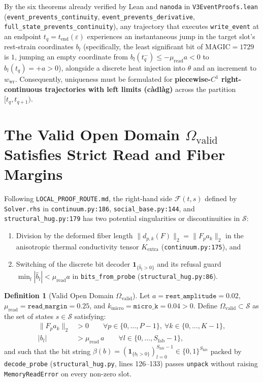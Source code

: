 \documentclass[11pt,a4paper]{article}
\theoremstyle{definition}
\newtheorem{definition}[theorem]{Definition}
\begin{document}
By the six theorems already verified by Lean and \texttt{nanoda} in \texttt{V3EventProofs.lean} (\texttt{event\_prevents\_continuity}, \texttt{event\_prevents\_derivative}, \texttt{full\_state\_prevents\_continuity}), any trajectory that executes \texttt{write\_event} at an endpoint $t_q = t_{\mathrm{end}}(\varepsilon)$ experiences an instantaneous jump in the target slot's rest-strain coordinates $b_l$ (specifically, the least significant bit of $\mathrm{MAGIC}=1729$ is $1$, jumping an empty coordinate from $b_l(t_q^-) \le -\mu_{\mathrm{read}}a < 0$ to $b_l(t_q) = +a > 0$), alongside a discrete heat injection into $\theta$ and an increment to $w_{\mathrm{wr}}$. Consequently, uniqueness must be formulated for \textbf{piecewise-$C^1$ right-continuous trajectories with left limits (c\`adl\`ag)} across the partition $[t_q, t_{q+1})$.

\section{\texorpdfstring{The Valid Open Domain $\Omega_{\mathrm{valid}}$ Satisfies Strict Read and Fiber Margins}{The Valid Open Domain Satisfies Strict Read and Fiber Margins}}

Following \texttt{LOCAL\_PROOF\_ROUTE.md}, the right-hand side $\mathcal{F}(t, s)$ defined by \texttt{Solver.rhs} in \texttt{continuum.py:186}, \texttt{social\_base.py:144}, and \texttt{structural\_hug.py:179} has two potential singularities or discontinuities in $\mathcal{S}$:
\begin{enumerate}
  \item Division by the deformed fiber length $\|d_{p,k}(F)\|_2 = \|F_p a_k\|_2$ in the anisotropic thermal conductivity tensor $K_{\mathrm{extra}}$ (\texttt{continuum.py:175}), and
  \item Switching of the discrete bit decoder $\mathbf{1}_{\{\widehat{b}_l > 0\}}$ and its refusal guard $\min_l |\widehat{b}_l| < \mu_{\mathrm{read}} a$ in \texttt{bits\_from\_probe} (\texttt{structural\_hug.py:86}).
\end{enumerate}

\begin{definition}[Valid Open Domain $\Omega_{\mathrm{valid}}$]
Let $a = \texttt{rest\_amplitude} = 0.02$, $\mu_{\mathrm{read}} = \texttt{read\_margin} = 0.25$, and $k_{\mathrm{micro}} = \texttt{micro\_k} = 0.04 > 0$. Define $\Omega_{\mathrm{valid}} \subset \mathcal{S}$ as the set of states $s \in \mathcal{S}$ satisfying:
\begin{align}
  \|F_p a_k\|_2 &> 0 \qquad \forall p \in \{0, \dots, P-1\},\ \forall k \in \{0, \dots, K-1\}, \label{eq:fiber_pos}\\
  |b_l| &> \mu_{\mathrm{read}}\, a \qquad \forall l \in \{0, \dots, S_{\mathrm{fab}}-1\}, \label{eq:well_margin}
\end{align}
and such that the bit string $\beta(b) = (\mathbf{1}_{\{b_l > 0\}})_{l=0}^{S_{\mathrm{fab}}-1} \in \{0,1\}^{S_{\mathrm{fab}}}$ packed by \texttt{decode\_probe} (\texttt{structural\_hug.py}, lines 126--133) passes \texttt{unpack} without raising \texttt{MemoryReadError} on every non-zero slot.
\end{definition}
\end{document}

